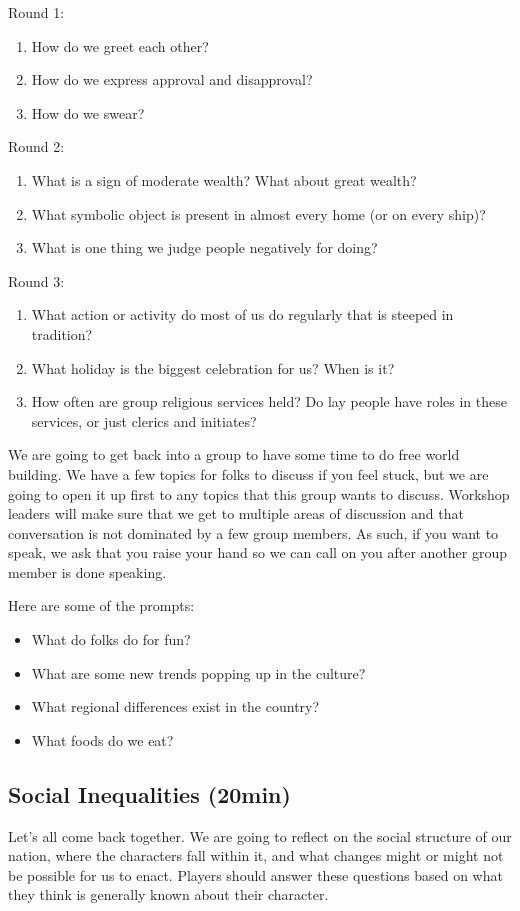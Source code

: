\documentclass[green]{GL2020}
\begin{document}
Round 1:
\begin{enumerate}
	\item How do we greet each other?
	\item How do we express approval and disapproval?
	\item How do we swear?
\end{enumerate}


Round 2:
\begin{enumerate}
	\item What is a sign of moderate wealth? What about great wealth?
	\item What symbolic object is present in almost every home (or on every ship)?
	\item What is one thing we judge people negatively for doing?
\end{enumerate}

Round 3:
\begin{enumerate}
	\item What action or activity do most of us do regularly that is steeped in tradition?
	\item What holiday is the biggest celebration for us? When is it?
	\item How often are group religious services held? Do lay people have roles in these services, or just clerics and initiates?
\end{enumerate}


We are going to get back into a group to have some time to do free world building.  We have a few topics for folks to discuss if you feel stuck, but we are going to open it up first to any topics that this group wants to discuss.  Workshop leaders will make sure that we get to multiple areas of discussion and that conversation is not dominated by a few group members.  As such, if you want to speak, we ask that you raise your hand so we can call on you after another group member is done speaking.

Here are some of the prompts:
\begin{itemize}
	\item What do folks do for fun?
	\item What are some new trends popping up in the culture?
	\item What regional differences exist in the country?
	\item What foods do we eat?
\end{itemize}  

\subsection*{Social Inequalities (20min)}
Let’s all come back together. We are going to reflect on the social structure of our nation, where the characters fall within it, and what changes might or might not be possible for us to enact.  Players should answer these questions based on what they think is generally known about their character.
\end{document}
